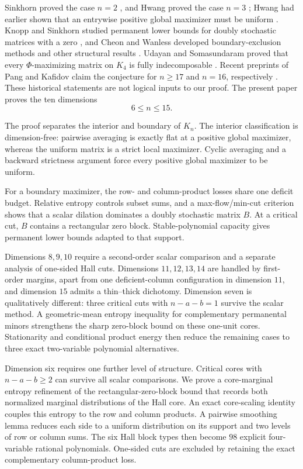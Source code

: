 \documentclass[11pt,a4paper]{article}
\numberwithin{equation}{section}
\theoremstyle{definition}
\newcommand{\1}{\mathbf{1}}
\begin{document}
Sinkhorn proved the case $n=2$ \cite{Sinkhorn1984}, and Hwang proved the case
$n=3$ \cite{Hwang1987}; Hwang had earlier shown that an entrywise positive
global maximizer must be uniform \cite{Hwang1986}.  Knopp and Sinkhorn studied permanent lower bounds for doubly stochastic
matrices with a zero \cite{KnoppSinkhorn1982}, and Cheon and Wanless
developed boundary-exclusion methods and other structural results
\cite{CheonWanless2012}.  Udayan and Somasundaram proved that every
$\Phi$-maximizing matrix on $K_4$ is fully indecomposable
\cite{UdayanSomasundaram2024}.  Recent preprints of Pang and Kafidov claim
the conjecture for $n\ge17$ and $n=16$, respectively
\cite{Pang2026,Kafidov2026}.  These historical statements are not logical
inputs to our proof.  The present paper proves the ten dimensions
\[
 6\le n\le15.
\]

The proof separates the interior and boundary of $K_n$.  The interior
classification is dimension-free: pairwise averaging is exactly flat at a
positive global maximizer, whereas the uniform matrix is a strict local
maximizer.  Cyclic averaging and a backward strictness argument force every
positive global maximizer to be uniform.

For a boundary maximizer, the row- and column-product losses share one
deficit budget.  Relative entropy controls subset sums, and a
max-flow/min-cut criterion shows that a scalar dilation dominates a doubly
stochastic matrix $B$.  At a critical cut, $B$ contains a rectangular zero
block.  Stable-polynomial capacity gives permanent lower bounds adapted to
that support.

Dimensions $8,9,10$ require a second-order scalar comparison and a separate
analysis of one-sided Hall cuts.  Dimensions $11,12,13,14$ are handled by
first-order margins, apart from one deficient-column configuration in
dimension $11$, and dimension $15$ admits a thin--thick dichotomy.
Dimension seven is qualitatively different: three critical cuts with
$n-a-b=1$ survive the scalar method.  A geometric-mean entropy inequality
for complementary permanental minors strengthens the sharp zero-block bound
on these one-unit cores.  Stationarity and conditional product energy then
reduce the remaining cases to three exact two-variable polynomial
alternatives.

Dimension six requires one further level of structure.  Critical cores with
$n-a-b\ge2$ can survive all scalar comparisons.  We prove a
core-marginal entropy refinement of the rectangular-zero-block bound that
records both normalized marginal distributions of the Hall core.  An exact
core-scaling identity couples this entropy to the row and column products.
A pairwise smoothing lemma reduces each side to a uniform distribution on
its support and two levels of row or column sums.  The six Hall block types
then become $98$ explicit four-variable rational polynomials.  One-sided
cuts are excluded by retaining the exact complementary column-product loss.
\end{document}
